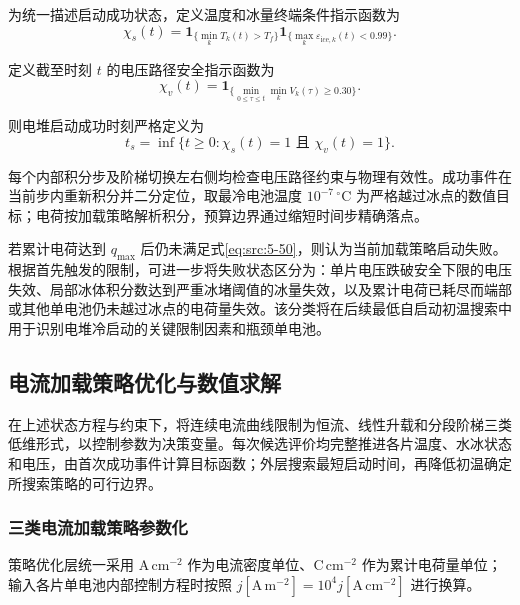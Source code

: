 \documentclass[bwprint]{gmcmthesis}
\numberwithin{equation}{section}
\numberwithin{figure}{section}
\begin{document}
 为统一描述启动成功状态，定义温度和冰量终端条件指示函数为
\begin{equation}
\chi_s(t) = \mathbf{1}_{\{\min\limits_k T_k(t) > T_f\}} \mathbf{1}_{\{\max\limits_k \varepsilon_{\text{ice},k}(t) < 0.99\}}. \label{eq:src:5-48}
\end{equation}

 定义截至时刻 \(t\) 的电压路径安全指示函数为
\begin{equation}
\chi_v(t) = \mathbf{1}_{\{\min\limits_{0 \leq \tau \leq t} \min\limits_k V_k(\tau) \geq 0.30\}}. \label{eq:src:5-49}
\end{equation}

 则电堆启动成功时刻严格定义为
\begin{equation}
t_s = \inf \{t \geq 0 : \chi_s(t) = 1 \text{ 且 } \chi_v(t) = 1\}. \label{eq:src:5-50}
\end{equation}

每个内部积分步及阶梯切换左右侧均检查电压路径约束与物理有效性。成功事件在当前步内重新积分并二分定位，取最冷电池温度 $10^{-7}\,{}^\circ\mathrm C$ 为严格越过冰点的数值目标；电荷按加载策略解析积分，预算边界通过缩短时间步精确落点。

 若累计电荷达到 \(q_{\text{max}}\) 后仍未满足式\eqref{eq:src:5-50}，则认为当前加载策略启动失败。根据首先触发的限制，可进一步将失败状态区分为：单片电压跌破安全下限的电压失效、局部冰体积分数达到严重冰堵阈值的冰量失效，以及累计电荷已耗尽而端部或其他单电池仍未越过冰点的电荷量失效。该分类将在后续最低自启动初温搜索中用于识别电堆冷启动的关键限制因素和瓶颈单电池。

\subsection{电流加载策略优化与数值求解}

在上述状态方程与约束下，将连续电流曲线限制为恒流、线性升载和分段阶梯三类低维形式，以控制参数为决策变量。每次候选评价均完整推进各片温度、水冰状态和电压，由首次成功事件计算目标函数；外层搜索最短启动时间，再降低初温确定所搜索策略的可行边界。
\subsubsection{三类电流加载策略参数化}
策略优化层统一采用 \(\mathrm{A\,cm^{-2}}\) 作为电流密度单位、\(\mathrm{C\,cm^{-2}}\) 作为累计电荷量单位；输入各片单电池内部控制方程时按照
\(j[\mathrm{A\,m^{-2}}]=10^4j[\mathrm{A\,cm^{-2}}]\)
进行换算。
\end{document}
